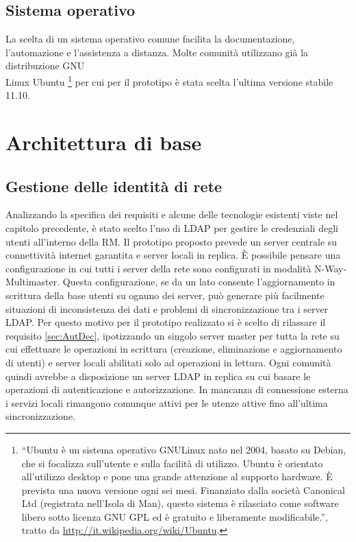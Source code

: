 \subsection{Sistema operativo}
La scelta di un sistema operativo comune facilita la documentazione,
l'automazione e l'assistenza a distanza. Molte comunità utilizzano già
la distribuzione GNU\\Linux Ubuntu \footnote{``Ubuntu è un sistema
  operativo GNU\/Linux nato nel 2004, basato su Debian, che si
  focalizza sull'utente e sulla facilità di utilizzo. Ubuntu è
  orientato all'utilizzo desktop e pone una grande attenzione al
  supporto hardware. È prevista una nuova versione ogni sei mesi.
  Finanziato dalla società Canonical Ltd (registrata nell'Isola di
  Man), questo sistema è rilasciato come software libero sotto licenza
  GNU GPL ed è gratuito e liberamente modificabile.'', tratto da
  \url{http://it.wikipedia.org/wiki/Ubuntu}.} per cui per il prototipo
è stata scelta l'ultima versione stabile 11.10.


\section{Architettura di base}

\subsection{Gestione delle identità di rete}
Analizzando la specifica dei requisiti e alcune delle tecnologie
esistenti viste nel capitolo precedente, è stato scelto l'uso di LDAP
per gestire le credenziali degli utenti all'interno della RM. Il
prototipo proposto prevede un server centrale su connettività internet
garantita e server locali in replica. È possibile pensare una
configurazione in cui tutti i server della rete sono configurati in
modalità N-Way-Multimaster. Questa configurazione, se da un lato
consente l'aggiornamento in scrittura della base utenti su ognuno dei
server, può generare più facilmente situazioni di inconsistenza dei
dati e problemi di sincronizzazione tra i server LDAP. Per questo
motivo per il prototipo realizzato si è scelto di rilassare il
requisito \ref{sec:AutDec}, ipotizzando un singolo server master per
tutta la rete su cui effettuare le operazioni in scrittura (creazione,
eliminazione e aggiornamento di utenti) e server locali abilitati solo
ad operazioni in lettura. Ogni comunità quindi avrebbe a disposizione
un server LDAP in replica su cui basare le operazioni di
autenticazione e autorizzazione. In mancanza di connessione esterna i
servizi locali rimangono comunque attivi per le utenze attive fino
all'ultima sincronizzazione.

